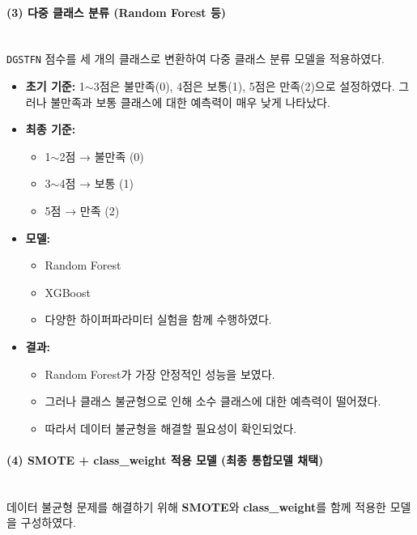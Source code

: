 \documentclass[sigconf]{acmart}
\begin{document}
\begin{CJK}{UTF8}{mj}
\paragraph{(3) 다중 클래스 분류 (Random Forest 등)}\mbox{}\\
\texttt{DGSTFN} 점수를 세 개의 클래스로 변환하여 다중 클래스 분류 모델을 적용하였다.
\begin{itemize}
  \item \textbf{초기 기준:} 1$\sim$3점은 불만족(0), 4점은 보통(1), 5점은 만족(2)으로 설정하였다. 그러나 불만족과 보통 클래스에 대한 예측력이 매우 낮게 나타났다.
  \item \textbf{최종 기준:}
  \begin{itemize}
    \item 1$\sim$2점 → 불만족 (0)
    \item 3$\sim$4점 → 보통 (1)
    \item 5점 → 만족 (2)
  \end{itemize}
  \item \textbf{모델:}
  \begin{itemize}
    \item Random Forest
    \item XGBoost
    \item 다양한 하이퍼파라미터 실험을 함께 수행하였다.
  \end{itemize}
  \item \textbf{결과:}
  \begin{itemize}
    \item Random Forest가 가장 안정적인 성능을 보였다.
    \item 그러나 클래스 불균형으로 인해 소수 클래스에 대한 예측력이 떨어졌다.
    \item 따라서 데이터 불균형을 해결할 필요성이 확인되었다.
  \end{itemize}
\end{itemize}

\paragraph{(4) SMOTE + class\_weight 적용 모델 (최종 통합모델 채택)}\mbox{}\\
데이터 불균형 문제를 해결하기 위해 \textbf{SMOTE}와 \textbf{class\_weight}를 함께 적용한 모델을 구성하였다.


\end{CJK}
\end{document}
